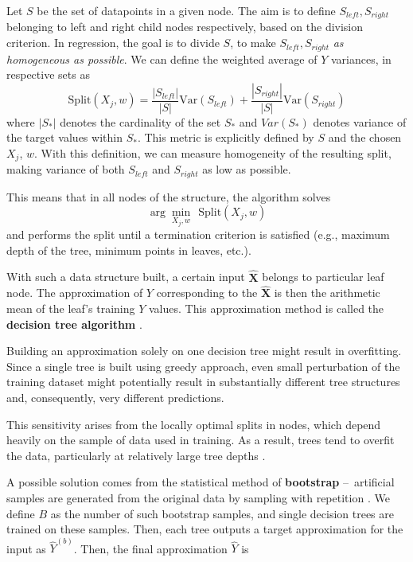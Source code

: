Let $S$ be the set of datapoints in a given node. The aim is to define $S_{left}, S_{right}$ belonging to left and right child nodes respectively, based on the division criterion.
In regression, the goal is to divide $S$, to make $S_{left}, S_{right}$ \textit{as homogeneous as possible}. We can define the weighted average of $Y$ variances, in respective sets as
\begin{equation}
    \text{Split}(X_j, w) = \frac{|S_{left}|}{|S|}\text{Var}(S_{left}) + \frac{|S_{right}|}{|S|}\text{Var}(S_{right})
\end{equation}
where $|S_{*}|$ denotes the cardinality of the set $S_{*}$ and $Var(S_{*})$ denotes variance of the target values within $S_{*}$. This metric is explicitly defined by $S$ and the chosen $X_j$, $w$.
With this definition, we can measure homogeneity of the resulting split, making variance of both $S_{left}$ and $S_{right}$ as low as possible.

This means that in all nodes of the structure, the algorithm solves
\begin{equation}
    \arg \min_{X_j, w} \>\> \text{Split}(X_j, w) 
\end{equation}
and performs the split until a termination criterion is satisfied (e.g., maximum depth of the tree, minimum points in leaves, etc.).

With such a data structure built, a certain input $\bm{\hat{X}}$ belongs to 
particular leaf node. The approximation of $Y$ corresponding to the $\bm{\hat{X}}$ is then the arithmetic mean of the leaf's training $Y$ values. This approximation method
is called the \textbf{decision tree algorithm} \cite{islp}.
\newline
\par
Building an approximation solely on one decision tree might result in overfitting. Since a single tree
is built using greedy approach, even small perturbation of the training dataset might potentially result
in substantially different tree structures and, consequently, very different predictions.

This sensitivity arises from the locally optimal splits in nodes, which depend heavily on the sample of data used in training.
As a result, trees tend to overfit the data, particularly at relatively large tree depths \cite{islp, skiena}.

A possible solution comes from the statistical method of \textbf{bootstrap} – artificial samples are generated from the original data by sampling with repetition \cite{skiena}. 
We define $B$ as the number of such bootstrap samples, and single decision trees are trained on these samples. Then, each tree
outputs a target approximation for the input as $\hat{Y}^{(b)}$. Then, the final approximation $\hat{Y}$ is

